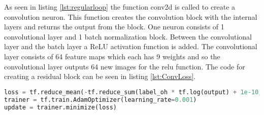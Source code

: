 As seen in listing \ref{lst:regularloop} the function conv2d is called to create a convolution neuron. This function creates the convolution block with the internal layers and returns the output from the block. One neuron consists of 1 convolutional layer and 1 batch normalization block. Between the convolutional layer and the batch layer a ReLU activation function is added. The convolutional layer consists of 64 feature maps which each has 9 weights and so the convolutional layer outputs 64 new images for the relu function. The code for creating a residual block can be seen in listing \ref{lst:ConvLoss}.

\begin{lstlisting}[language=Python, label=lst:ConvLoss, caption= Implementation of learning rate type ADAM]
loss = tf.reduce_mean(-tf.reduce_sum(label_oh * tf.log(output) + 1e-10, axis=[1]))
trainer = tf.train.AdamOptimizer(learning_rate=0.001)
update = trainer.minimize(loss)
\end{lstlisting}